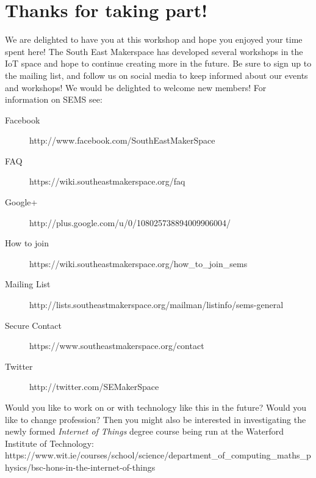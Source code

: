 \newpage
\chapter*{Thanks for taking part!}

We are delighted to have you at this workshop and hope you enjoyed your time spent here! The South East Makerspace has developed several workshops in the IoT space and hope to continue creating more in the future. Be sure to sign up to the mailing list, and follow us on social media to keep informed about our events and workshops! We would be delighted to welcome new members! For information on SEMS see:

\begin{description}
	\item[Facebook] http://www.facebook.com/SouthEastMakerSpace
	\item[FAQ] https://wiki.southeastmakerspace.org/faq
	\item[Google+] http://plus.google.com/u/0/108025738894009906004/
	\item[How to join] https://wiki.southeastmakerspace.org/how\_to\_join\_sems
	\item[Mailing List] http://lists.southeastmakerspace.org/mailman/listinfo/sems-general
	\item[Secure Contact] https://www.southeastmakerspace.org/contact
	\item[Twitter] http://twitter.com/SEMakerSpace
\end{description} 

Would you like to work on or with technology like this in the future? Would you like to change profession? Then you might also be interested in investigating the newly formed \textit{Internet of Things} degree course being run at the Waterford Institute of Technology: https://www.wit.ie/courses/school/science/department\_of\_computing\_maths\_physics/bsc-hons-in-the-internet-of-things



